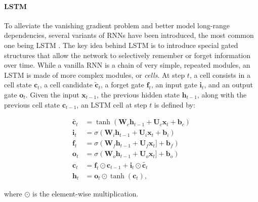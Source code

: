 
\paragraph{\ac{LSTM}}

To alleviate the vanishing gradient problem and better model long-range dependencies, several variants of \acp{RNN} have been introduced, the most common one being \ac{LSTM} \citep{hochreiter1997long}. The key idea behind \ac{LSTM} is to introduce special gated structures that allow the network to selectively remember or forget information over time. While a vanilla \ac{RNN} is a chain of very simple, repeated modules, an \ac{LSTM} is made of more complex modules, or \textit{cells}. At step $t$, a cell consists in a cell state $\bm{c}_t$, a cell candidate $\tilde{\bm{c}}_t$, a forget gate $\bm{f}_t$, an input gate $\bm{i}_t$, and an output gate $\bm{o}_t$. Given the input $\bm{x}_{t-1}$, the previous hidden state $\bm{h}_{t-1}$, along with the previous cell state $\bm{c}_{t-1}$, an \ac{LSTM} cell at step $t$ is defined by:

\begin{equation}
\begin{aligned}
    \tilde{\bm{c}_t} &= \tanh \left( \bm{W}_c \bm{h}_{t-1} + \bm{U}_c \bm{x}_t + \bm{b}_c \right)\\
    \bm{i}_t         &= \sigma \left( \bm{W}_i \bm{h}_{t-1} + \bm{U}_i \bm{x}_t + \bm{b}_i \right) \\
    \bm{f}_t         &= \sigma \left( \bm{W}_f \bm{h}_{t-1} + \bm{U}_f \bm{x}_t] + \bm{b}_f \right) \\
    \bm{o}_t         &= \sigma \left( \bm{W}_o \bm{h}_{t-1} + \bm{U}_o \bm{x}_t] + \bm{b}_o \right) \\
    \bm{c}_t         &= \bm{f}_t \odot \bm{c}_{t-1} + \bm{i}_t \odot \tilde{\bm{c}_t} \\
    \bm{h}_t         &= \bm{o}_t \odot \tanh (\bm{c}_t),
\end{aligned}
\end{equation}

where $\odot$ is the element-wise multiplication.

